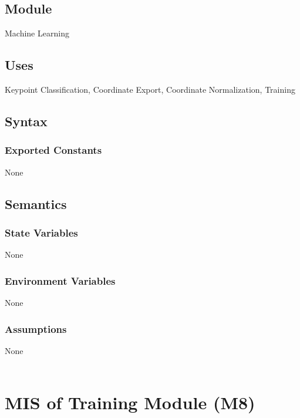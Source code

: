 \documentclass[12pt, titlepage]{article}
\begin{document}
\subsection{Module}

Machine Learning\\

\subsection{Uses}

Keypoint Classification, Coordinate Export, Coordinate Normalization, Training\\

\subsection{Syntax}

\subsubsection{Exported Constants}

None\\

\subsection{Semantics}

\subsubsection{State Variables}

None\\

\subsubsection{Environment Variables}

None\\

\subsubsection{Assumptions}

None\\

~\newpage

\section{MIS of Training Module (M8)} \label{M8}
\end{document}
